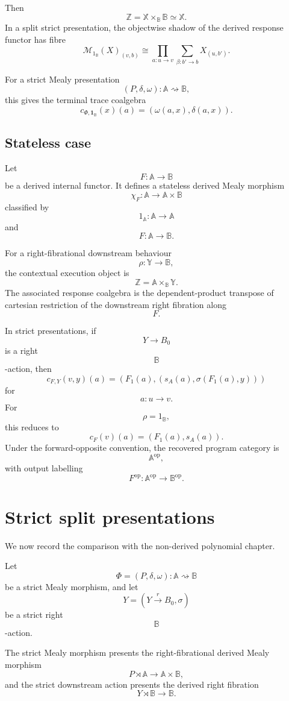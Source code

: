 Then
\[
\mathbb Z
=
\mathbb X\times_{\mathbb B}\mathbb B
\simeq
\mathbb X.
\]
In a split strict presentation, the objectwise shadow of the derived response
functor has fibre
\[
\mathcal M_{1_{\mathbb B}}(X)_{(v,b)}
\cong
\prod_{a:u\to v}
\sum_{\beta:b'\to b}
X_{(u,b')}.
\]

For a strict Mealy presentation
\[
(P,\delta,\omega):\mathbb A\rightsquigarrow\mathbb B,
\]
this gives the terminal trace coalgebra
\[
c_{\Phi,\mathbf 1_{\mathbb B}}(x)(a)
=
(\omega(a,x),\delta(a,x)).
\]

\subsection{Stateless case}

Let
\[
F:\mathbb A\to\mathbb B
\]
be a derived internal functor.  It defines a stateless derived Mealy morphism
\[
\chi_F:\mathbb A\to\mathbb A\times\mathbb B
\]
classified by
\[
1_{\mathbb A}:\mathbb A\to\mathbb A
\]
and
\[
F:\mathbb A\to\mathbb B.
\]

For a right-fibrational downstream behaviour
\[
\rho:\mathbb Y\to\mathbb B,
\]
the contextual execution object is
\[
\mathbb Z
=
\mathbb A\times_{\mathbb B}\mathbb Y.
\]
The associated response coalgebra is the dependent-product transpose of
cartesian restriction of the downstream right fibration along
\[
F.
\]

In strict presentations, if
\[
Y\to B_0
\]
is a right
\[
\mathbb B
\]
-action, then
\[
c_{F,Y}(v,y)(a)
=
\left(
F_1(a),
\left(
s_A(a),
\sigma(F_1(a),y)
\right)
\right)
\]
for
\[
a:u\to v.
\]
For
\[
\rho=1_{\mathbb B},
\]
this reduces to
\[
c_F(v)(a)=(F_1(a),s_A(a)).
\]
Under the forward-opposite convention, the recovered program category is
\[
\mathbb A^{\mathrm{op}},
\]
with output labelling
\[
F^{\mathrm{op}}:\mathbb A^{\mathrm{op}}\to\mathbb B^{\mathrm{op}}.
\]

\section{Strict split presentations}
\label{sec:derived-poly-strict-presentations}

We now record the comparison with the non-derived polynomial chapter.

Let
\[
\Phi=(P,\delta,\omega):\mathbb A\rightsquigarrow\mathbb B
\]
be a strict Mealy morphism, and let
\[
Y=(Y\xrightarrow{r}B_0,\sigma)
\]
be a strict right
\[
\mathbb B
\]
-action.

The strict Mealy morphism presents the right-fibrational derived Mealy
morphism
\[
P\rtimes\mathbb A\to\mathbb A\times\mathbb B,
\]
and the strict downstream action presents the derived right fibration
\[
Y\rtimes\mathbb B\to\mathbb B.
\]

